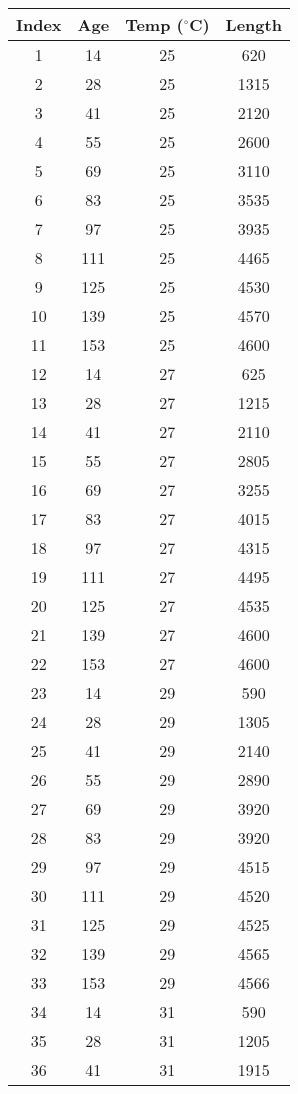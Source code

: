 \newpage
\begin{minipage}{2.25in}
\begin{center}
\begin{tabular}{cccc}
Index	&Age	&Temp ($^\circ$C)	&Length \\ \hline
 1   &14  &25   &620 \\
 2   &28  &25  &1315 \\
 3   &41  &25  &2120 \\
 4   &55  &25  &2600 \\
 5   &69  &25  &3110 \\
 6   &83  &25  &3535 \\
 7   &97  &25  &3935 \\
 8  &111  &25  &4465 \\
 9  &125  &25  &4530 \\
10  &139  &25  &4570 \\
11  &153  &25  &4600 \\
12   &14  &27   &625 \\
13   &28  &27  &1215 \\
14   &41  &27  &2110 \\
15   &55  &27  &2805 \\
16   &69  &27  &3255 \\
17   &83  &27  &4015 \\
18   &97  &27  &4315 \\
19  &111  &27  &4495 \\
20  &125  &27  &4535 \\
21  &139  &27  &4600 \\
22  &153  &27  &4600 \\
23   &14  &29   &590 \\
24   &28  &29  &1305 \\
25   &41  &29  &2140 \\
26   &55  &29  &2890 \\
27   &69  &29  &3920 \\
28   &83  &29  &3920 \\
29   &97  &29  &4515 \\
30  &111  &29  &4520 \\
31  &125  &29  &4525 \\
32  &139  &29  &4565 \\
33  &153  &29  &4566 \\
34   &14  &31   &590 \\
35   &28  &31  &1205 \\
36   &41  &31  &1915 \\

\end{tabular}
\end{center}
\end{minipage}
